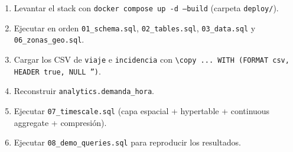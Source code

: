 \documentclass[11pt,a4paper]{article}
\begin{document}
\begin{enumerate}
  \item Levantar el stack con \texttt{docker compose up -d --build} (carpeta \texttt{deploy/}).
  \item Ejecutar en orden \texttt{01\_schema.sql}, \texttt{02\_tables.sql},
        \texttt{03\_data.sql} y \texttt{06\_zonas\_geo.sql}.
  \item Cargar los CSV de \texttt{viaje} e \texttt{incidencia} con
        \texttt{\textbackslash copy ... WITH (FORMAT csv, HEADER true, NULL '')}.
  \item Reconstruir \texttt{analytics.demanda\_hora}.
  \item Ejecutar \texttt{07\_timescale.sql} (capa espacial + hypertable + continuous
        aggregate + compresión).
  \item Ejecutar \texttt{08\_demo\_queries.sql} para reproducir los resultados.
\end{enumerate}
\end{document}
